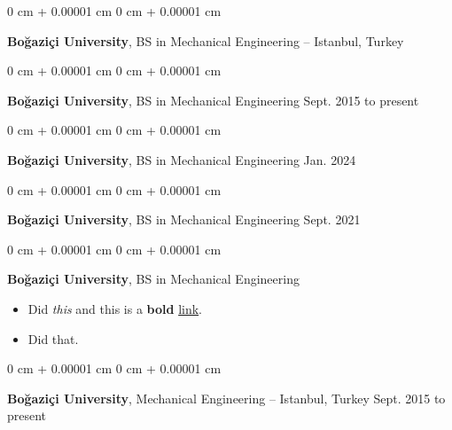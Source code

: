 \documentclass[10pt, letterpaper]{article}
\newenvironment{highlights}{
    \begin{itemize}[
        topsep=0.10 cm,
        parsep=0.10 cm,
        partopsep=0pt,
        itemsep=0pt,
        leftmargin=0 cm + 10pt
    ]
}{
    \end{itemize}
        
    \vspace{-0.20cm}
} %
\newenvironment{onecolentry}{
    \begin{adjustwidth}{
        0 cm + 0.00001 cm
    }{
        0 cm + 0.00001 cm
    }
}{
    \end{adjustwidth}
} %
\begin{document}
        \begin{onecolentry}
            \textbf{Boğaziçi University}, BS in Mechanical Engineering -- Istanbul, Turkey \hfill 
        \end{onecolentry}

        \vspace{0.1 cm}

        \begin{onecolentry}
            \textbf{Boğaziçi University}, BS in Mechanical Engineering \hfill Sept. 2015 to present
        \end{onecolentry}

        \vspace{0.1 cm}

        \begin{onecolentry}
            \textbf{Boğaziçi University}, BS in Mechanical Engineering \hfill Jan. 2024
        \end{onecolentry}

        \vspace{0.1 cm}

        \begin{onecolentry}
            \textbf{Boğaziçi University}, BS in Mechanical Engineering \hfill Sept. 2021
        \end{onecolentry}

        \vspace{0.1 cm}

        \begin{onecolentry}
            \textbf{Boğaziçi University}, BS in Mechanical Engineering \hfill 
            \begin{highlights}
                \item Did \textit{this} and this is a \textbf{bold} \href{https://example.com}{link}.
                \item Did that.
            \end{highlights}
        \end{onecolentry}

        \vspace{0.1 cm}

        \begin{onecolentry}
            \textbf{Boğaziçi University}, Mechanical Engineering -- Istanbul, Turkey \hfill Sept. 2015 to present
        \end{onecolentry}

        \vspace{0.1 cm}
\end{document}

